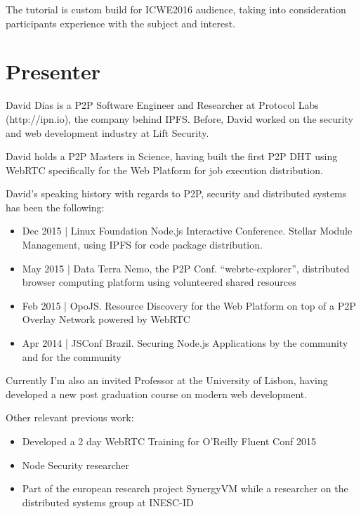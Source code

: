 \documentclass[runningheads,a4paper]{llncs}
\begin{document}
The tutorial is custom build for ICWE2016 audience, taking into consideration participants experience with the subject and interest.


\section{Presenter}\label{sec:presenter}

David Dias is a P2P Software Engineer and Researcher at Protocol Labs (http://ipn.io), the company behind IPFS\@. Before, David worked on the security and web development industry at Lift Security.

David holds a P2P Masters in Science, having built the first P2P DHT using WebRTC specifically for the Web Platform for job execution distribution.

David's speaking history with regards to P2P, security and distributed systems has been the following:

\begin{itemize}
  \item Dec 2015 | Linux Foundation Node.js Interactive Conference. Stellar Module
Management, using IPFS for code package distribution.
  \item May 2015 | Data Terra Nemo, the P2P Conf. ``webrtc-explorer'', distributed browser
computing platform using volunteered shared resources
  \item Feb 2015 | OpoJS\@. Resource Discovery for the Web Platform on top of a P2P
Overlay Network powered by WebRTC
  \item Apr 2014 | JSConf Brazil. Securing Node.js Applications by the community and for
the community
\end{itemize}

Currently I'm also an invited Professor at the University of Lisbon, having developed a new post graduation course on modern web development.

Other relevant previous work:

\begin{itemize}
  \item Developed a 2 day WebRTC Training for O'Reilly Fluent Conf 2015
  \item Node Security researcher
  \item Part of the european research project SynergyVM while a researcher on the
distributed systems group at INESC-ID
\end{itemize}
\end{document}
